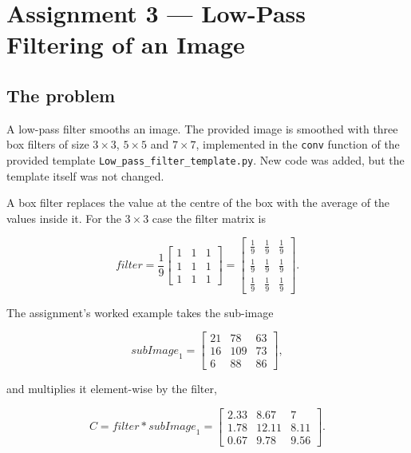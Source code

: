 \chapter{Assignment 3 --- Low-Pass Filtering of an Image}
\label{ch:hw3}

\section{The problem}
\label{sec:hw3-problem}

A low-pass filter smooths an image. The provided image is smoothed with three
box filters of size $3\times3$, $5\times5$ and $7\times7$, implemented in the
\texttt{conv} function of the provided template
\texttt{Low\_pass\_filter\_template.py}. New code was added, but the template
itself was not changed.

A box filter replaces the value at the centre of the box with the average of the
values inside it. For the $3\times3$ case the filter matrix is

\begin{equation}
\label{eq:hw3-filter3}
\mathit{filter} = \frac{1}{9}
\begin{bmatrix}
1 & 1 & 1 \\
1 & 1 & 1 \\
1 & 1 & 1
\end{bmatrix}
=
\begin{bmatrix}
\frac{1}{9} & \frac{1}{9} & \frac{1}{9} \\[2pt]
\frac{1}{9} & \frac{1}{9} & \frac{1}{9} \\[2pt]
\frac{1}{9} & \frac{1}{9} & \frac{1}{9}
\end{bmatrix}.
\end{equation}

The assignment's worked example takes the sub-image

\begin{equation}
\label{eq:hw3-subimage}
\mathit{subImage}_1 =
\begin{bmatrix}
21 & 78 & 63 \\
16 & 109 & 73 \\
6 & 88 & 86
\end{bmatrix},
\end{equation}

and multiplies it element-wise by the filter,

\begin{equation}
\label{eq:hw3-conv}
C = \mathit{filter} * \mathit{subImage}_1 =
\begin{bmatrix}
2.33 & 8.67 & 7 \\
1.78 & 12.11 & 8.11 \\
0.67 & 9.78 & 9.56
\end{bmatrix}.
\end{equation}

